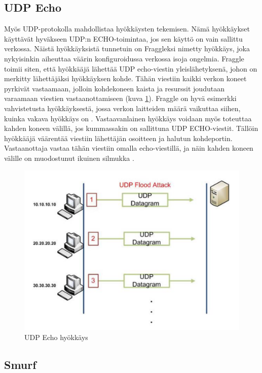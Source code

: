 \subsection{UDP Echo}

Myös UDP-protokolla mahdollistaa hyökkäysten tekemisen. Nämä
hyökkäykset käyt\-tä\-vät hyväkseen UDP:n ECHO-toimintaa, jos sen käyttö
on vain sallittu verkossa. Näistä hyökkäyksistä tunnetuin on Fraggleksi
nimetty hyökkäys, joka nykyisinkin aiheuttaa väärin konfiguroidussa verkossa isoja ongelmia.
Fraggle toimii siten, että hyökkääjä lähettää UDP echo-viestin yleislähetyksenä, johon on merkitty lähettäjäksi
hyökkäyksen kohde. Tähän viestiin kaikki verkon koneet pyrkivät vastaamaan,
jolloin kohdekoneen kaista ja resurssit joudutaan varaamaan viestien vastaanottamiseen (kuva \ref{echo}). 
Fraggle on hyvä esimerkki vahvistetusta hyökkäyksestä, jossa verkon laitteiden määrä
vaikuttaa siihen, kuinka vakava hyökkäys on \cite{WEBS}. Vastaavanlainen
hyökkäys voidaan myös toteuttaa kahden koneen välillä, jos kummassakin
on sallittuna UDP ECHO-viestit. Tällöin hyökkääjä väärentää viestiin
lähettäjän osoitteen ja halutun kohdeportin. Vastaanottaja vastaa
tähän viestiin omalla echo-viestillä, ja näin kahden koneen välille on
muodostunut ikuinen silmukka \cite{TCP}.

\begin{figure}[htp]
\centering
\includegraphics[width=12cm]{pics/echo.pdf}
\caption{UDP Echo hyökkäys}
\label{echo}
\end{figure}

\subsection{Smurf}

